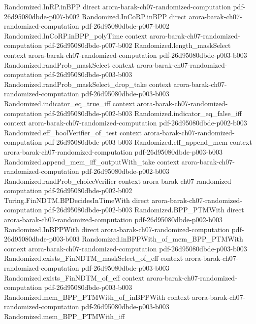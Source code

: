 \begin{theorem}
\proofstep
  {Randomized.InRP.inBPP}
  {direct}
  {arora-barak-ch07-randomized-computation}
  {pdf-26d95080dbde-p007-b002}
\proofstep
  {Randomized.InCoRP.inBPP}
  {direct}
  {arora-barak-ch07-randomized-computation}
  {pdf-26d95080dbde-p007-b002}
\proofstep
  {Randomized.InCoRP.inBPP_polyTime}
  {context}
  {arora-barak-ch07-randomized-computation}
  {pdf-26d95080dbde-p007-b002}
\proofstep
  {Randomized.length_maskSelect}
  {context}
  {arora-barak-ch07-randomized-computation}
  {pdf-26d95080dbde-p003-b003}
\proofstep
  {Randomized.randProb_maskSelect}
  {context}
  {arora-barak-ch07-randomized-computation}
  {pdf-26d95080dbde-p003-b003}
\proofstep
  {Randomized.randProb_maskSelect_drop_take}
  {context}
  {arora-barak-ch07-randomized-computation}
  {pdf-26d95080dbde-p003-b003}
\proofstep
  {Randomized.indicator_eq_true_iff}
  {context}
  {arora-barak-ch07-randomized-computation}
  {pdf-26d95080dbde-p002-b003}
\proofstep
  {Randomized.indicator_eq_false_iff}
  {context}
  {arora-barak-ch07-randomized-computation}
  {pdf-26d95080dbde-p002-b003}
\proofstep
  {Randomized.eff_boolVerifier_of_test}
  {context}
  {arora-barak-ch07-randomized-computation}
  {pdf-26d95080dbde-p003-b003}
\proofstep
  {Randomized.eff_append_mem}
  {context}
  {arora-barak-ch07-randomized-computation}
  {pdf-26d95080dbde-p003-b003}
\proofstep
  {Randomized.append_mem_iff_outputWith_take}
  {context}
  {arora-barak-ch07-randomized-computation}
  {pdf-26d95080dbde-p002-b003}
\proofstep
  {Randomized.randProb_choiceVerifier}
  {context}
  {arora-barak-ch07-randomized-computation}
  {pdf-26d95080dbde-p002-b002}
\proofstep
  {Turing.FinNDTM.BPDecidesInTimeWith}
  {direct}
  {arora-barak-ch07-randomized-computation}
  {pdf-26d95080dbde-p002-b003}
\proofstep
  {Randomized.BPP_PTMWith}
  {direct}
  {arora-barak-ch07-randomized-computation}
  {pdf-26d95080dbde-p002-b003}
\proofstep
  {Randomized.InBPPWith}
  {direct}
  {arora-barak-ch07-randomized-computation}
  {pdf-26d95080dbde-p003-b003}
\proofstep
  {Randomized.inBPPWith_of_mem_BPP_PTMWith}
  {context}
  {arora-barak-ch07-randomized-computation}
  {pdf-26d95080dbde-p003-b003}
\proofstep
  {Randomized.exists_FinNDTM_maskSelect_of_eff}
  {context}
  {arora-barak-ch07-randomized-computation}
  {pdf-26d95080dbde-p003-b003}
\proofstep
  {Randomized.exists_FinNDTM_of_eff}
  {context}
  {arora-barak-ch07-randomized-computation}
  {pdf-26d95080dbde-p003-b003}
\proofstep
  {Randomized.mem_BPP_PTMWith_of_inBPPWith}
  {context}
  {arora-barak-ch07-randomized-computation}
  {pdf-26d95080dbde-p003-b003}
\proofstep
  {Randomized.mem_BPP_PTMWith_iff}

\end{theorem}
